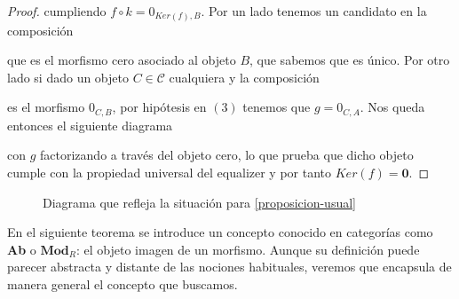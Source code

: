 \begin{proof}
    cumpliendo $f \circ k = 0_{Ker(f),B}$. Por un lado tenemos un candidato en la composición 
    que es el morfismo cero asociado al objeto $B$, que sabemos que es único. Por otro lado si dado un objeto $C \in \mathscr{C}$ cualquiera y la composición
    es el morfismo $0_{C,B}$, por hipótesis en $(3)$ tenemos que $g = 0_{C,A}$. Nos queda entonces el siguiente diagrama
    con $g$ factorizando a través del objeto cero, lo que prueba que dicho objeto cumple con la propiedad universal del equalizer y por tanto $Ker(f) = \boldsymbol{0}$.
\end{proof}

\begin{figure}[ht!]
    \centering
    \caption{Diagrama que refleja la situación para \ref{proposicion-usual}}
    \label{diagrama-dificil}
\end{figure}

En el siguiente teorema se introduce un concepto conocido en categorías como \textbf{Ab} o $\mathbf{Mod}_R$: el objeto imagen de un morfismo. Aunque su definición puede parecer abstracta y distante de las nociones habituales, veremos que encapsula de manera general el concepto que buscamos.

